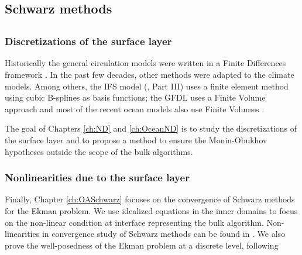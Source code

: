 \subsection{Schwarz methods}
\subsection{}
\subsubsection*{Discretizations of the surface layer}
Historically the general circulation models were written in
a Finite Differences framework \citep{randall_general_2000}. In the
past few decades, other methods were adapted to the
climate models. Among others, the IFS model
(\citep{ecmwf_ifs_2020}, Part III)
uses a finite element method using cubic B-splines as basis
functions;
the GFDL uses a Finite Volume approach
\citep{harris_scientific_2021}
and most of the recent ocean models also use
Finite Volumes \citep{griffies_fundamentals_2005}.
\par
{}
The goal of Chapters \ref{ch:ND} and \ref{ch:OceanND}
is to study the discretizations of the surface layer and
to propose a method to ensure the Monin-Obukhov hypotheses
outside the scope of the bulk algorithms.
\subsubsection*{Nonlinearities due to the surface layer}
Finally, Chapter \ref{ch:OASchwarz} focuses on the convergence
of Schwarz methods for the Ekman problem. We use idealized
equations in the inner domains to focus on the non-linear
condition at interface representing the bulk algorithm.
Non-linearities in convergence study of Schwarz methods
can be found in .
We also prove the well-posedness of the Ekman problem
at a discrete level, following

